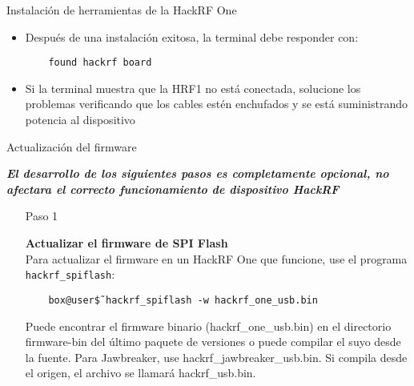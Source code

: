 \begin{frame}{Instalación de  herramientas de la HackRF One}

\begin{itemize}
    \item
    Después de una instalación exitosa, la terminal debe responder con: 

    \begin{block}{}
    \texttt{ ~~~found hackrf board}
    \end{block}
    \item
    {Si la terminal muestra que la HRF1 no está conectada, solucione los problemas verificando que los cables estén enchufados y se está suministrando potencia al dispositivo}
    
\end{itemize}
\end{frame}

\begin{frame}{Actualización del firmware}

\textbf \textit {El desarrollo de los siguientes pasos es completamente opcional, no afectara el correcto funcionamiento de dispositivo HackRF}

\begin{itemize}
    \item [Paso 1]
    {\textbf {Actualizar el firmware de SPI Flash }\\ Para actualizar el firmware en un HackRF One que funcione, use el programa \texttt{hackrf\_spiflash}:
    
    \begin{block}{}
    \texttt{
    ~~~box@user\~\$ hackrf\_spiflash -w hackrf\_one\_usb.bin}
    \end{block}
    
    Puede encontrar el firmware binario (hackrf\_one\_usb.bin) en el directorio firmware-bin del último paquete de versiones o puede compilar el suyo desde la fuente. Para Jawbreaker, use hackrf\_jawbreaker\_usb.bin. Si compila desde el origen, el archivo se llamará hackrf\_usb.bin. 
    }
    
\end{itemize}
\end{frame}

